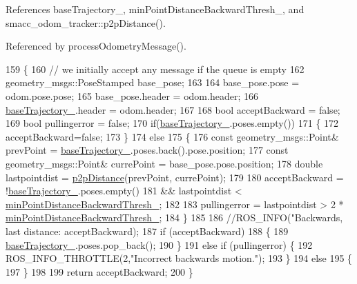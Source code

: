 References base\+Trajectory\+\_\+, min\+Point\+Distance\+Backward\+Thresh\+\_\+, and smacc\+\_\+odom\+\_\+tracker\+::p2p\+Distance().



Referenced by process\+Odometry\+Message().


\begin{DoxyCode}
159 \{
160     \textcolor{comment}{// we initially accept any message if the queue is empty   }
162 \textcolor{comment}{}    geometry\_msgs::PoseStamped base\_pose;
163     
164     base\_pose.pose = odom.pose.pose;
165     base\_pose.header = odom.header;
166     \hyperlink{classsmacc__odom__tracker_1_1OdomTracker_ac3a17be46ab833632c5f63e75c840dc7}{baseTrajectory\_}.header = odom.header;
167 
168     \textcolor{keywordtype}{bool} acceptBackward = \textcolor{keyword}{false};
169     \textcolor{keywordtype}{bool} pullingerror = \textcolor{keyword}{false};
170     \textcolor{keywordflow}{if}(\hyperlink{classsmacc__odom__tracker_1_1OdomTracker_ac3a17be46ab833632c5f63e75c840dc7}{baseTrajectory\_}.poses.empty())
171     \{
172         acceptBackward=\textcolor{keyword}{false};
173     \}
174     \textcolor{keywordflow}{else}
175     \{
176         \textcolor{keyword}{const} geometry\_msgs::Point& prevPoint = \hyperlink{classsmacc__odom__tracker_1_1OdomTracker_ac3a17be46ab833632c5f63e75c840dc7}{baseTrajectory\_}.poses.back().pose.position;
177         \textcolor{keyword}{const} geometry\_msgs::Point& currePoint = base\_pose.pose.position;
178         \textcolor{keywordtype}{double} lastpointdist = \hyperlink{namespacesmacc__odom__tracker_a93496d9bf987249b884e9b0e60778a11}{p2pDistance}(prevPoint, currePoint);
179         
180         acceptBackward = !\hyperlink{classsmacc__odom__tracker_1_1OdomTracker_ac3a17be46ab833632c5f63e75c840dc7}{baseTrajectory\_}.poses.empty() 
181                         && lastpointdist < \hyperlink{classsmacc__odom__tracker_1_1OdomTracker_a79d94520c5da1852602aaf264377a82f}{minPointDistanceBackwardThresh\_};
182 
183         pullingerror = lastpointdist > 2 * \hyperlink{classsmacc__odom__tracker_1_1OdomTracker_a79d94520c5da1852602aaf264377a82f}{minPointDistanceBackwardThresh\_};
184     \}
185 
186     \textcolor{comment}{//ROS\_INFO("Backwards, last distance: %
       acceptBackward);}
187     \textcolor{keywordflow}{if} (acceptBackward) 
188     \{
189         \hyperlink{classsmacc__odom__tracker_1_1OdomTracker_ac3a17be46ab833632c5f63e75c840dc7}{baseTrajectory\_}.poses.pop\_back();
190     \} 
191     \textcolor{keywordflow}{else} \textcolor{keywordflow}{if} (pullingerror) \{
192         ROS\_INFO\_THROTTLE(2,\textcolor{stringliteral}{"Incorrect backwards motion."});
193     \} 
194     \textcolor{keywordflow}{else} 
195     \{
197     \}
198 
199     \textcolor{keywordflow}{return} acceptBackward;
200 \}
\end{DoxyCode}


